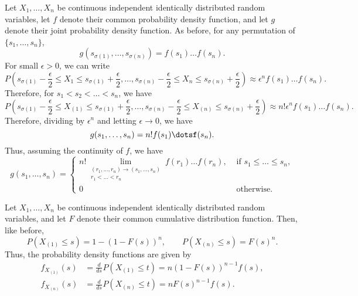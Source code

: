\documentclass[11pt]{article}
\newcommand\dd[3][]{\frac{d^{#1}{#2}}{d {#3}^{#1}}}
\theoremstyle{definition}
\theoremstyle{remark}
\numberwithin{equation}{module}
\begin{document}
    \begin{theorem}
        Let $X_1, \dots, X_n$ be continuous independent identically distributed random
        variables, let $f$ denote their common probability density function, and let
        $g$ denote their joint probability density function.
        As before, for any permutation of $\{s_1, \dots, s_n\}$, \[
            g(s_{\sigma(1)}, \dots, s_{\sigma(n)}) = f(s_1) \dots f(s_n).
        \] For small $\epsilon > 0$, we can write \[
            P\left(s_{\sigma(1)} - \frac{\epsilon}{2} \leq X_1 \leq s_{\sigma(1)} +
            \frac{\epsilon}{2}, \dots,  s_{\sigma(n)} - \frac{\epsilon}{2} \leq X_n
            \leq s_{\sigma(n)} + \frac{\epsilon}{2}\right) \approx
            \epsilon^nf(s_1)\dots f(s_n).
        \] Therefore, for $s_1 < s_2 < \dots < s_n$, we have \[
            P\left(s_{\sigma(1)} - \frac{\epsilon}{2} \leq X_{(1)} \leq
            s_{\sigma(1)} + \frac{\epsilon}{2}, \dots,  s_{\sigma(n)} -
            \frac{\epsilon}{2} \leq X_{(n)} \leq s_{\sigma(n)} +
            \frac{\epsilon}{2}\right) \approx n!\epsilon^nf(s_1)\dots f(s_n).
        \] Therefore, dividing by $\epsilon^n$ and letting $\epsilon \to 0$, we have
        \[
            g(s_1, \dots, s_n) = n! f(s_1)\dotsf(s_n).
        \] Thus, assuming the continuity of $f$, we have \[
            g(s_1, \dots, s_n) = \begin{cases}
                n!\lim_{\substack{(r_1, \dots, r_n) \to (s_1, \dots, s_n) \\ r_1 <
                \dots < r_n}} f(r_1) \dots f(r_n), &\text{ if }s_1 \leq \dots \leq
                s_n, \\
                0 &\text{ otherwise}.
            \end{cases}
        \] 
    \end{theorem}
    
    \begin{theorem}
        Let $X_1, \dots, X_n$ be continuous independent identically distributed random
        variables, and let $F$ denote their common cumulative distribution function.
        Then, like before, \[
            P(X_{(1)} \leq s) = 1 - (1 - F(s))^n, \qquad
            P(X_{(n)} \leq s) = F(s)^n.
        \] Thus, the probability density functions are given by \begin{align*}
            f_{X_{(1)}}(s) &= \dd{}{s}P(X_{(1)} \leq t) = n (1 - F(s))^{n - 1} f(s), \\
            f_{X_{(n)}}(s) &= \dd{}{s}P(X_{(n)} \leq t) = n F(s)^{n - 1} f(s).
        \end{align*}
    \end{theorem}
    
\end{document}
